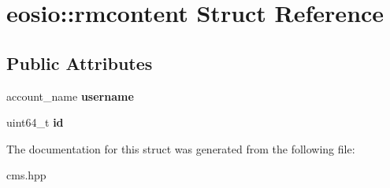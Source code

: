 \hypertarget{structeosio_1_1rmcontent}{}\section{eosio\+:\+:rmcontent Struct Reference}
\label{structeosio_1_1rmcontent}
\subsection*{Public Attributes}
\begin{DoxyCompactItemize}
\item 
\mbox{\label{structeosio_1_1rmcontent_a365c84e768dc7715faabf23710136430}} 
account\+\_\+name {\bfseries username}
\item 
\mbox{\label{structeosio_1_1rmcontent_a1f629b8abccf4af4ea619a982d23cade}} 
uint64\+\_\+t {\bfseries id}
\end{DoxyCompactItemize}


The documentation for this struct was generated from the following file\+:\begin{DoxyCompactItemize}
\item 
cms.\+hpp\end{DoxyCompactItemize}
